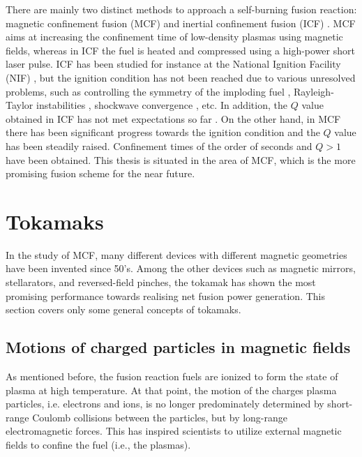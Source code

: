 There are mainly two distinct methods to approach a self-burning fusion reaction: magnetic confinement fusion (MCF) \cite{Artsimovich_1972_NF} and inertial confinement fusion (ICF) \cite{Miller_2004_NF_NIF, Craxton_2015_PoP}. MCF aims at increasing the confinement time of low-density plasmas using magnetic fields, whereas in ICF the fuel is heated and compressed using a high-power short laser pulse. ICF has been studied for instance at the National Ignition Facility (NIF) \cite{Moses_2016_FST}, but the ignition condition has not been reached due to various unresolved problems, such as controlling the symmetry of the imploding fuel \cite{Michel_PRL_2009}, Rayleigh-Taylor instabilities \cite{Nagel_2017_PoP}, shockwave convergence \cite{Ma_2016_IEEE}, etc. In addition, the $Q$ value obtained in ICF has not met expectations so far \cite{Ross_2015_PRE, Le-Pape_2018_PRL}. On the other hand, in MCF there has been significant progress towards the ignition condition and the $Q$ value has been steadily raised. Confinement times of the order of seconds and $Q > 1$ have been obtained\cite{Romanelli_2015_NF}. This thesis is situated in the area of MCF, which is the more promising fusion scheme for the near future.


\section{Tokamaks} \label{sec:tokamak}


In the study of MCF, many different devices with different magnetic geometries have been invented since 50's. Among the other devices such as magnetic mirrors, stellarators, and reversed-field pinches, the tokamak has shown the most promising performance towards realising net fusion power generation. This section covers only some general concepts of tokamaks.


\subsection{Motions of charged particles in magnetic fields}


As mentioned before, the fusion reaction fuels are ionized to form the state of plasma at high temperature. At that point, the motion of the charges plasma particles, i.e. electrons and ions, is no longer predominately determined by short-range Coulomb collisions between the particles, but by long-range electromagnetic forces. This has inspired scientists to utilize external magnetic fields to confine the fuel (i.e., the plasmas).

